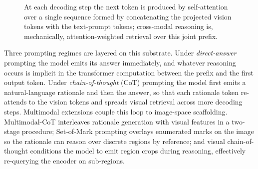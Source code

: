 \begin{figure}[!ht]
  \centering
  \caption[Joint vision-plus-text prefix at decoding time]{At
  each decoding step the next token is produced by
  self-attention over a single sequence formed by concatenating
  the projected vision tokens with the text-prompt tokens;
  cross-modal reasoning is, mechanically, attention-weighted
  retrieval over this joint prefix.}
  \label{fig:joint-prefix}
\end{figure}

Three prompting regimes are layered on this substrate. Under
\emph{direct-answer} prompting the model emits its answer
immediately, and whatever reasoning occurs is implicit in the
transformer computation between the prefix and the first
output token. Under \emph{chain-of-thought} (CoT) prompting
\citep{wei2022chain} the model first emits a natural-language
rationale and then the answer, so that each rationale token
re-attends to the vision tokens and spreads visual retrieval
across more decoding steps. Multimodal extensions couple this
loop to image-space scaffolding. Multimodal-CoT
\citep{zhang2023mmcot} interleaves rationale generation with
visual features in a two-stage procedure; Set-of-Mark prompting
\citep{yang2023som} overlays enumerated marks on the image so
the rationale can reason over discrete regions by reference;
and visual chain-of-thought \citep{shao2024visualcot}
conditions the model to emit region crops during reasoning,
effectively re-querying the encoder on sub-regions.

